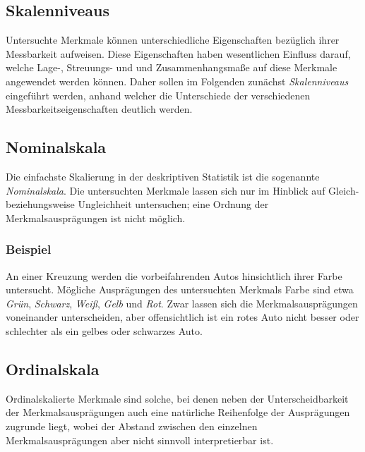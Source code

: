 \documentclass[fontsize=11pt]{scrartcl}
\begin{document}
            \subsection{Skalenniveaus}
                Untersuchte Merkmale können unterschiedliche Eigenschaften bezüglich ihrer Messbarkeit aufweisen. Diese Eigenschaften haben wesentlichen Einfluss darauf, welche Lage-, Streuungs- und und Zusammenhangsmaße auf diese Merkmale angewendet werden können.
                Daher sollen im Folgenden zunächst \emph{Skalenniveaus} eingeführt werden, anhand welcher die Unterschiede der verschiedenen Messbarkeitseigenschaften deutlich werden.
            \subsection{Nominalskala}
                Die einfachste Skalierung in der deskriptiven Statistik ist die sogenannte \emph{Nominalskala}. Die untersuchten Merkmale lassen sich nur im Hinblick auf Gleich- beziehungsweise Ungleichheit untersuchen; eine Ordnung der Merkmalsausprägungen ist nicht möglich. 
                \cite{kohn2005}
                \subsubsection{Beispiel}
                    An einer Kreuzung werden die vorbeifahrenden Autos hinsichtlich ihrer Farbe untersucht. Mögliche Ausprägungen des untersuchten Merkmals Farbe sind etwa \emph{Grün}, \emph{Schwarz}, \emph{Weiß}, \emph{Gelb} und \emph{Rot}. Zwar lassen sich die Merkmalsausprägungen voneinander unterscheiden, aber offensichtlich ist ein rotes Auto nicht besser oder schlechter als ein gelbes oder schwarzes Auto.
                \subsection{Ordinalskala}
                    Ordinalskalierte Merkmale sind solche, bei denen neben der Unterscheidbarkeit der Merkmalsausprägungen auch eine natürliche Reihenfolge der Ausprägungen zugrunde liegt, wobei der Abstand zwischen den einzelnen Merkmalsausprägungen aber nicht sinnvoll interpretierbar ist. \cite{kohn2005}
\end{document}
